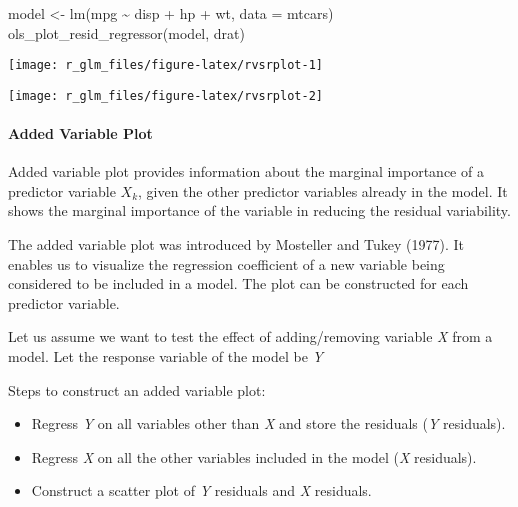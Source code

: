 \documentclass[
]{article}
\newenvironment{Shaded}{\begin{snugshade}}{\end{snugshade}}
\newcommand{\AttributeTok}[1]{\textcolor[rgb]{0.77,0.63,0.00}{#1}}
\newcommand{\FunctionTok}[1]{\textcolor[rgb]{0.00,0.00,0.00}{#1}}
\newcommand{\NormalTok}[1]{#1}
\newcommand{\OtherTok}[1]{\textcolor[rgb]{0.56,0.35,0.01}{#1}}
\newcommand{\SpecialCharTok}[1]{\textcolor[rgb]{0.00,0.00,0.00}{#1}}
\newcommand{\StringTok}[1]{\textcolor[rgb]{0.31,0.60,0.02}{#1}}
\providecommand{\tightlist}{%
  \setlength{\itemsep}{0pt}\setlength{\parskip}{0pt}}
\begin{document}
\begin{Shaded}
\begin{Highlighting}[]
\NormalTok{model }\OtherTok{\textless{}{-}} \FunctionTok{lm}\NormalTok{(mpg }\SpecialCharTok{\textasciitilde{}}\NormalTok{ disp }\SpecialCharTok{+}\NormalTok{ hp }\SpecialCharTok{+}\NormalTok{ wt, }\AttributeTok{data =}\NormalTok{ mtcars)}
\FunctionTok{ols\_plot\_resid\_regressor}\NormalTok{(model, }\StringTok{\textquotesingle{}drat\textquotesingle{}}\NormalTok{)}
\end{Highlighting}
\end{Shaded}

\begin{center}\texttt{[image: r\_glm\_files/figure-latex/rvsrplot-1]} \end{center}

\begin{center}\texttt{[image: r\_glm\_files/figure-latex/rvsrplot-2]} \end{center}

\hypertarget{added-variable-plot}{%
\paragraph{Added Variable Plot}\label{added-variable-plot}}

Added variable plot provides information about the marginal importance
of a predictor variable \(X_{k}\), given the other predictor variables
already in the model. It shows the marginal importance of the variable
in reducing the residual variability.

The added variable plot was introduced by Mosteller and Tukey (1977). It
enables us to visualize the regression coefficient of a new variable
being considered to be included in a model. The plot can be constructed
for each predictor variable.

Let us assume we want to test the effect of adding/removing variable
\emph{X} from a model. Let the response variable of the model be
\emph{Y}

Steps to construct an added variable plot:

\begin{itemize}
\tightlist
\item
  Regress \emph{Y} on all variables other than \emph{X} and store the
  residuals (\emph{Y} residuals).
\item
  Regress \emph{X} on all the other variables included in the model
  (\emph{X} residuals).
\item
  Construct a scatter plot of \emph{Y} residuals and \emph{X} residuals.
\end{itemize}
\end{document}
